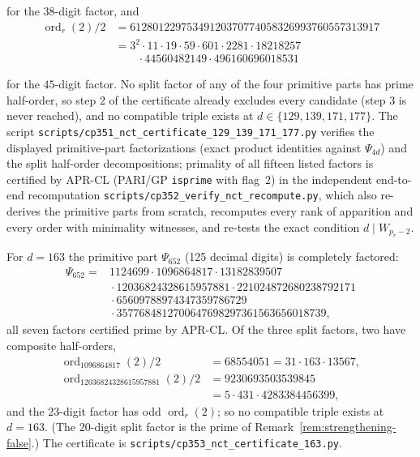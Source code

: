 \documentclass[11pt]{amsart}
\theoremstyle{plain}
\theoremstyle{definition}
\theoremstyle{remark}
\numberwithin{equation}{section}
\newcommand{\ord}{\operatorname{ord}}
\begin{document}
for the $38$-digit factor, and
\[
\begin{aligned}
  \ord_r(2)/2
  &=61280122975349120370774058326993760557313917\\
  &=3^2\cdot11\cdot19\cdot59\cdot601\cdot2281\cdot18218257\\
  &\qquad{}\cdot44560482149\cdot496160696018531
\end{aligned}
\]
{\sloppy
for the $45$-digit factor. No split factor of any of the four primitive parts has prime half-order, so step 2 of the certificate already excludes every candidate (step 3 is never reached), and no compatible triple exists at $d\in\{129,139,171,177\}$. The script \texttt{scripts/}\allowbreak\texttt{cp351\_nct\_certificate\_129\_139\_171\_177.py} verifies the displayed primitive-part factorizations (exact product identities against $\Psi_{4d}$) and the split half-order decompositions; primality of all fifteen listed factors is certified by APR-CL (PARI/GP \texttt{isprime} with flag~$2$) in the independent end-to-end recomputation \texttt{scripts/}\allowbreak\texttt{cp352\_verify\_nct\_recompute.py}, which also re-derives the primitive parts from scratch, recomputes every rank of apparition and every order with minimality witnesses, and re-tests the exact condition $d\mid W_{p_r-2}$.\par}

For $d=163$ the primitive part $\Psi_{652}$ (125 decimal digits) is completely factored:
\[
\begin{aligned}
  \Psi_{652}={}&1124699\cdot1096864817\cdot13182839507\\
  &{}\cdot12036824328615957881\cdot221024872680238792171\\
  &{}\cdot65609788974347359786729\\
  &{}\cdot3577684812700647698297361563656018739,
\end{aligned}
\]
all seven factors certified prime by APR-CL. Of the three split factors, two have composite half-orders,
\[
\begin{aligned}
  \ord_{1096864817}(2)/2&=68554051=31\cdot163\cdot13567,\\
  \ord_{12036824328615957881}(2)/2&=9230693503539845\\
  &=5\cdot431\cdot4283384456399,
\end{aligned}
\]
and the $23$-digit factor has odd $\ord_r(2)$; so no compatible triple exists at $d=163$. (The $20$-digit split factor is the prime of Remark~\ref{rem:strengthening-false}.) The certificate is \texttt{scripts/}\allowbreak\texttt{cp353\_nct\_certificate\_163.py}.
\end{document}
